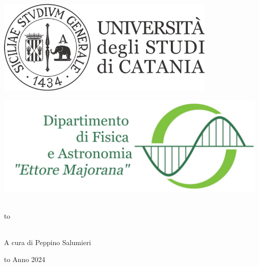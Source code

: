 \documentclass[openany,12pt]{book}
\newcommand\blankpage{%
    \null
    \thispagestyle{empty}%
    \newpage} %
\begin{document}
\thispagestyle{empty}
\begin{center}

\begin{minipage}[c]{0.45\textwidth}
\begin{flushleft}
\includegraphics[width=0.8\textwidth]{logo-unict-orizzontale-grigio.png}
\end{flushleft}
\end{minipage}
\hfill
\begin{minipage}[c]{0.45\textwidth}
\begin{flushright}
\includegraphics[width=\textwidth]{logo_dfa_orizzontale}
\end{flushright}
\end{minipage}\\
\medskip
\hbox to \textwidth{\hrulefill}

\vfill
\vfill

\uppercase{}\\

\vfill
\large{A cura di Peppino Salumieri}

\vfill
\vfill
\hbox to \textwidth{\hrulefill}
{\sc Anno 2024}
\end{center}

\afterpage{\blankpage}
\newpage

\clearpage                       %
{                                %
  \pagestyle{empty}              %
  {
    \fancyhf{}%
    \renewcommand{\headrulewidth}{0pt}%
    \renewcommand{\footrulewidth}{0pt}%
  }
  \tableofcontents
  \thispagestyle{empty}          %
} %
\end{document}
